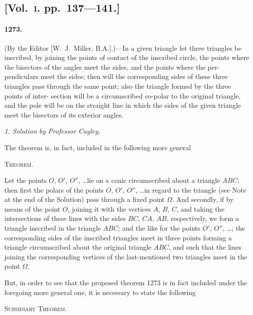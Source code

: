 \documentclass[11pt,a4paper]{article}
\begin{document}
\subsection*{[Vol.~\textsc{i}. pp.\ 137---141.]}

\paragraph*{1273.} (By the Editor [W.~J.~Miller, B.A.].)---In a given triangle let three
triangles be inscribed, by joining the points of contact of the inscribed circle, the
points where the bisectors of the angles meet the sides, and the points where the per-
pendiculars meet the sides; then will the corresponding sides of these three triangles
pass through the same point; also the triangle formed by the three points of inter-
section will be a circumscribed co-polar to the original triangle, and the pole will be
on the straight line in which the sides of the given triangle meet the bisectors of its
exterior angles.

\begin{center}
\textit{1. Solution by Professor Cayley.}
\end{center}

The theorem is, in fact, included in the following more general

\begin{center}
\textsc{Theorem.}
\end{center}

Let the points $O$, $O'$, $O''$, \ldots lie on a conic circumscribed about a
triangle $ABC$; then first the polars of the points $O$, $O'$, $O''$, \ldots in regard to the
triangle (see Note at the end of the Solution) pass through a fixed point $\Omega$. And
secondly, if by means of the point $O$, joining it with the vertices $A$, $B$, $C$, and taking
the intersections of these lines with the sides $BC$, $CA$, $AB$, respectively, we form a
triangle inscribed in the triangle $ABC$; and the like for the points $O'$, $O''$, \ldots; the
corresponding sides of the inscribed triangles meet in three points forming a triangle
circumscribed about the original triangle $ABC$, and such that the lines joining the
corresponding vertices of the last-mentioned two triangles meet in the point $\Omega$.

But, in order to see that the proposed theorem 1273 is in fact included under
the foregoing more general one, it is necessary to state the following

\begin{center}
\textsc{Subsidiary Theorem.}
\end{center}
\end{document}
